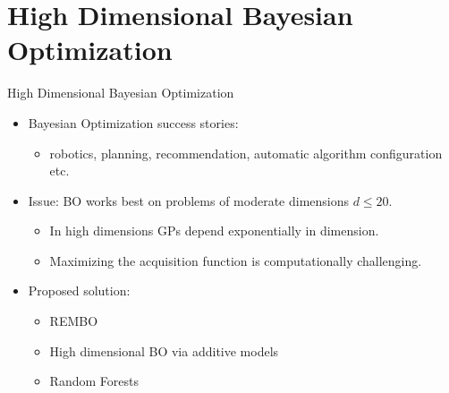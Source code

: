 \section{High Dimensional Bayesian Optimization}
\begin{frame}[c]{High Dimensional Bayesian Optimization}
\begin{itemize}
    \item Bayesian Optimization success stories:
    \pause
    \begin{itemize}
        \item robotics, planning, recommendation, automatic algorithm configuration etc.
    \end{itemize}
    \pause
    \item Issue: BO works best on problems of moderate dimensions $d\leq20$.
    \pause
    \begin{itemize}
        \item In high dimensions GPs depend exponentially in dimension.
        \item Maximizing the acquisition function is computationally challenging.
    \end{itemize}
    \item Proposed solution:
    \pause
    \begin{itemize}
        \item REMBO 
        \pause
        \item High dimensional BO via additive models 
        \pause
        \item Random Forests 
    \end{itemize}
\end{itemize}


\end{frame}

